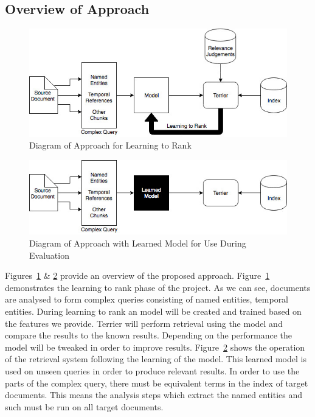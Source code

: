 \documentclass{mprop}
\begin{document}
\subsection{Overview of Approach}\label{proposed_approach.overview}
\begin{figure}[H]
\centering
\includegraphics[scale=0.65]{images/5yp-architecture}
\caption{Diagram of Approach for Learning to Rank}
\label{architecture1}
\end{figure}
\begin{figure}[H]
\centering
\includegraphics[scale=0.65]{images/5yp-architecture-learned}
\caption{Diagram of Approach with Learned Model for Use During Evaluation}
\label{architecture2}
\end{figure}
Figures~\ref{architecture1} \& \ref{architecture2} provide an overview of the proposed approach.
Figure~\ref{architecture1} demonstrates the learning to rank phase of the project.
As we can see, documents are analysed to form complex queries consisting of named entities, temporal entities. During learning to rank an model will be created and trained based on the features we provide. Terrier will perform retrieval using the model and compare the results to the known results. Depending on the performance the model will be tweaked in order to improve results.
Figure~\ref{architecture2} shows the operation of the retrieval system following the learning of the model. This learned model is used on unseen queries in order to produce relevant results.
In order to use the parts of the complex query, there must be equivalent terms in the index of target documents. This means the analysis steps which extract the named entities and such must be run on all target documents.
\end{document}
